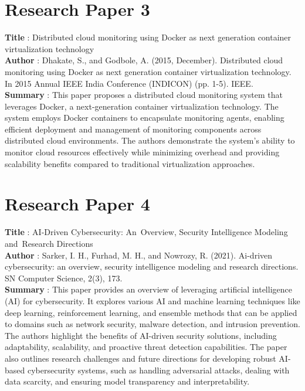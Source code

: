 \section{Research Paper 3}
\textbf{Title }: Distributed cloud monitoring using Docker as next generation container virtualization technology
\\
\textbf{Author }: Dhakate, S., and Godbole, A. (2015, December). Distributed cloud monitoring using Docker as next generation container virtualization technology. In 2015 Annual IEEE India Conference (INDICON) (pp. 1-5). IEEE.
\\
\textbf{Summary }: This paper proposes a distributed cloud monitoring system that leverages Docker, a next-generation container virtualization technology. The system employs Docker containers to encapsulate monitoring agents, enabling efficient deployment and management of monitoring components across distributed cloud environments. The authors demonstrate the system's ability to monitor cloud resources effectively while minimizing overhead and providing scalability benefits compared to traditional virtualization approaches.

\section{Research Paper 4}
\textbf{Title} : AI‑Driven Cybersecurity: An Overview, Security Intelligence Modeling and Research Directions
\\
\textbf{Author} : Sarker, I. H., Furhad, M. H., and Nowrozy, R. (2021). Ai-driven cybersecurity: an overview, security intelligence modeling and research directions. SN Computer Science, 2(3), 173.
\\
\textbf{Summary} : This paper provides an overview of leveraging artificial intelligence (AI) for cybersecurity. It explores various AI and machine learning techniques like deep learning, reinforcement learning, and ensemble methods that can be applied to domains such as network security, malware detection, and intrusion prevention. The authors highlight the benefits of AI-driven security solutions, including adaptability, scalability, and proactive threat detection capabilities. The paper also outlines research challenges and future directions for developing robust AI-based cybersecurity systems, such as handling adversarial attacks, dealing with data scarcity, and ensuring model transparency and interpretability.


